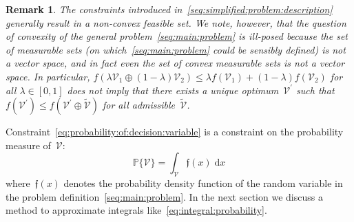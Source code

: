 \documentclass[letterpaper, 10pt, conference]{ieeeconf} %
\newtheorem{rem}[thm]{Remark}
\begin{document}
\begin{rem}
The constraints introduced in~\eqref{seq:simplified:problem:description} generally result in a non-convex feasible set.
%
We note, however, that the question of convexity of the general problem~\eqref{seq:main:problem} is ill-posed because the set of measurable sets (on which~\eqref{seq:main:problem} could be sensibly defined) is not a vector space, and in fact even the set of convex measurable sets is not a vector space.
In particular, $f(\lambda\mathcal V_1\oplus(1-\lambda)\mathcal V_2)\leq\lambda f(\mathcal V_1)+(1-\lambda)f(\mathcal V_2)$ for all $\lambda\in[0,1]$ does not imply that there exists a unique optimum~$\mathcal V^\prime$ such that $f(\mathcal V^\prime)\leq f(\mathcal V^\prime\oplus\tilde{\mathcal V})$ for all admissible~$\tilde{\mathcal V}$.
%
\end{rem}
%
\noindent Constraint~\eqref{eq:probability:of:decision:variable} is a constraint on the probability measure of~$\mathcal V$:
%
\begin{equation}\label{eq:integral:probability}
	\mathbb P\{\mathcal V\} = \int_{\mathcal V}\mathfrak f(x) \; \mathrm d x
\end{equation}
%
where~$\mathfrak f(x)$ denotes the probability density function of the random variable in the problem definition~\eqref{seq:main:problem}.
%
In the next section we discuss a method to approximate integrals like~\eqref{eq:integral:probability}.
\end{document}
